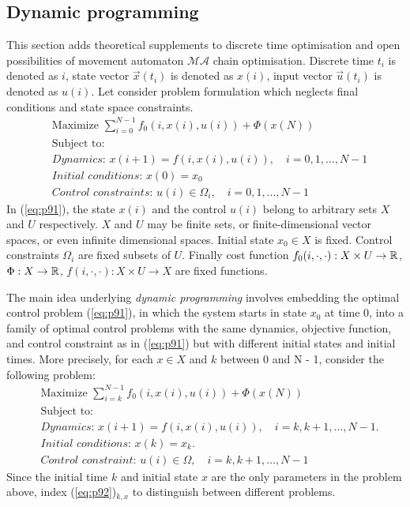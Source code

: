 \subsection{Dynamic programming}\label{s:dynap}
\noindent This section adds theoretical supplements to discrete time optimisation and open possibilities of movement automaton $\mathscr{MA}$ chain optimisation. Discrete time $t_i$ is denoted as $i$, state vector $\vec{x}(t_i)$ is denoted as $x(i)$, input vector $\vec{u}(t_i)$ is denoted as $u(i)$.
\noindent Let consider problem formulation which neglects final conditions and state space constraints.
\begin{equation}\label{eq:p91}
    \begin{split}
        &\text{Maximize } \sum_{i=0}^{N-1} f_0(i,x(i),u(i)) + \Phi(x(N))\\
        &\text{Subject to: }\\
        &\textit{Dynamics: } x(i+1) = f(i,x(i),u(i)),\quad
        i = 0,1,\dots,N-1\\
        &\textit{Initial conditions: } x(0)= x_0\\
        &\textit{Control constraints: } u(i)\in\Omega_i,\quad i = 0,1,\dots
        , N-1
    \end{split}
\end{equation}
\noindent In (\ref{eq:p91}), the state $x(i)$ and the control $u(i)$ belong to arbitrary sets $X$ and $U$ respectively. $X$ and $U$ may be finite sets, or finite-dimensional vector spaces, or even infinite dimensional spaces. Initial state $x_0\in X$ is fixed. Control constraints $\Omega_i$ are fixed subsets of $U$. Finally cost function $f_0(i,\cdot,\cdot):X\times U \to \mathbb{R}$, $\Phi: X \to \mathbb{R}$, $f(i,\cdot,\cdot): X \times U \to X$ are fixed functions.


\newpage\noindent The main idea underlying \textit{dynamic programming} involves embedding the optimal control problem (\ref{eq:p91}), in which the system starts in state $x_0$ at time $0$, into a family of optimal control problems with the same dynamics, objective function, and control constraint as in (\ref{eq:p91}) but with different initial states and initial times. More precisely, for each $x \in X$ and $k$ between 0 and N - 1, consider the following
problem:
\begin{equation}\label{eq:p92}
    \begin{split}
        &\text{Maximize } \sum_{i=k}^{N-1} f_0(i,x(i),u(i)) + \Phi(x(N))\\
        &\text{Subject to: }\\
        &\textit{Dynamics: } x(i+1) =  f (i,x(i),u(i)), \quad i = k,k+1,\dots, N-1.\\
        &\textit{Initial conditions: } x(k)=x_k.\\
        &\textit{Control constraint: } u(i) \in \Omega,\quad i = k,k+1,\dots,N-1
    \end{split}
\end{equation}
\noindent Since the initial time $k$ and initial state $x$ are the only parameters in the problem above, index (\ref{eq:p92})$_{k,x}$ to distinguish between different problems.

